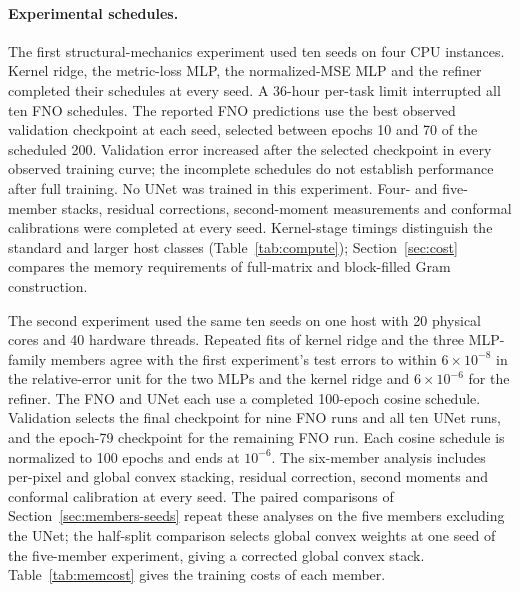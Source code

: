 \paragraph{Experimental schedules.} The first structural-mechanics experiment
used ten seeds on four CPU instances. Kernel ridge, the metric-loss MLP, the
normalized-MSE MLP and the refiner completed their schedules at every seed.
A 36-hour per-task limit interrupted all ten FNO schedules. The reported
FNO predictions use the best observed validation checkpoint at each seed,
selected between epochs 10 and 70 of the scheduled 200. Validation error
increased after the selected checkpoint in every observed training curve;
the incomplete schedules do not establish performance after full training.
No UNet was trained in this experiment. Four- and five-member stacks, residual
corrections, second-moment measurements and conformal calibrations were
completed at every seed. Kernel-stage timings distinguish the standard and larger host classes
(Table~\ref{tab:compute}); Section~\ref{sec:cost} compares the memory
requirements of full-matrix and block-filled Gram construction.

The second experiment used the same ten seeds on one host with 20 physical
cores and 40 hardware threads. Repeated fits of kernel ridge and the three
MLP-family members agree with the first experiment's test errors to within $6\times10^{-8}$ in the relative-error unit
for the two MLPs and the kernel ridge and $6\times10^{-6}$ for the refiner.
The FNO and UNet each use a completed 100-epoch cosine schedule. Validation
selects the final checkpoint for nine FNO runs and all ten UNet runs, and
the epoch-79 checkpoint for the remaining FNO run. Each cosine schedule is normalized to 100 epochs and ends at $10^{-6}$. The six-member analysis includes per-pixel and global convex stacking,
residual correction, second moments and conformal calibration at every
seed. The paired comparisons of Section~\ref{sec:members-seeds} repeat
these analyses on the five members excluding the UNet; the half-split comparison selects global convex weights at one seed
of the five-member experiment, giving a corrected global convex stack. Table~\ref{tab:memcost} gives the training costs of each member.

